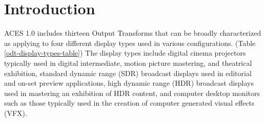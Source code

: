 \unnumberedformat	    %
\chapter{Introduction} 	%
ACES 1.0 includes thirteen Output Transforms that can be broadly characterized as applying to four different display types used in various configurations. (Table \ref{odt-display-types-table}) The display types include digital cinema projectors typically used in digital intermediate, motion picture mastering, and theatrical exhibition, standard dynamic range (SDR) broadcast displays used in editorial and on-set preview applications, high dynamic range (HDR) broadcast displays used in mastering an exhibition of HDR content, and computer desktop monitors such as those typically used in the creation of computer generated visual effects (VFX).

